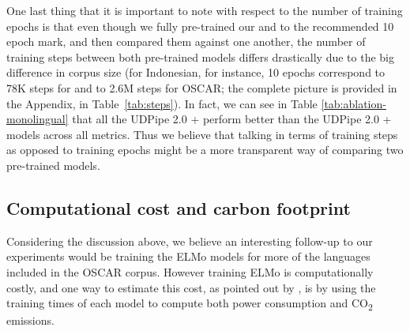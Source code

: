 One last thing that it is important to note with respect to the number of training epochs is that even though we fully pre-trained our \elmowikis and \elmooscars to the recommended 10 epoch mark, and then compared them against one another, the number of training steps between both pre-trained models differs drastically due to the big difference in corpus size (for Indonesian, for instance, 10 epochs correspond to 78K steps for \elmowiki and to 2.6M steps for OSCAR; the complete picture is provided in the Appendix, in Table~\ref{tab:steps}). In fact, we can see in Table \ref{tab:ablation-monolingual} that all the UDPipe 2.0 + \elmooscarone perform better than the UDPipe 2.0 + \elmowikione models across all metrics. Thus we believe that talking in terms of training steps as opposed to training epochs might be a more transparent way of comparing two pre-trained models.

\subsection{Computational cost and carbon footprint}\label{cost}

Considering the discussion above, we believe an interesting follow-up to our experiments would be training the ELMo models for more of the languages included in the OSCAR corpus. However training ELMo is computationally costly, and one way to estimate this cost, as pointed out by \citet{strubell-etal-2019-energy}, is by using the training times of each model to compute both power consumption and CO\textsubscript{2} emissions.

